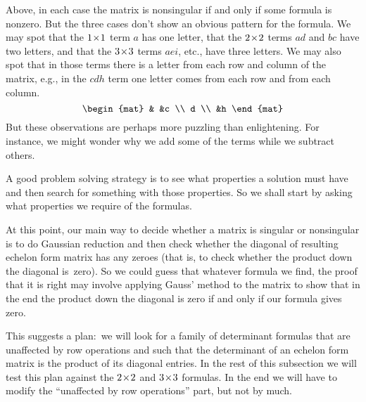 Above, in each case the matrix is nonsingular if and only 
if some formula is nonzero.
But the three cases don't 
show an obvious pattern for the formula. 
We may spot that the \(1 \! \times \! 1\) term
\( a \) has one letter, that the \(2 \! \times \! 2\) terms
\(ad\) and \(bc\) have two letters, and that the \(3 \! \times \! 3\)
terms \(aei\), etc., have three letters.
We may also spot that in those terms
there is a letter from each row and column of the matrix, e.g., 
in the \(cdh\) term one letter 
comes from each row and from each column.
\begin{equation*}
   \begin{mat}
          &    &c \\
      d           \\
          &h
   \end{mat} 
\end{equation*}
But these observations are perhaps more puzzling than
enlightening.
For instance, we might wonder why 
we add some of the terms while we subtract others.

A good problem solving strategy is to
see what properties a solution must have and
then search for something with those properties.
So we shall start by asking what properties we require of the formulas.

At this point, our
main way to decide whether a matrix is singular or nonsingular
is to do Gaussian 
reduction and then check whether 
the diagonal of resulting echelon form matrix has any zeroes
(that is, to check whether the product down the diagonal is~zero).
So we could guess that whatever formula we find, the proof that 
it is right may involve applying Gauss' method to the matrix
to show that in the end the product down the diagonal is zero if and only if
our formula gives zero. 

This suggests a plan:~we will look for a family of determinant
formulas that are 
unaffected by row operations and such that the determinant of an
echelon form matrix is the product of its diagonal entries.
In the rest of this subsection we will test this plan against the 
$2 \! \times \! 2$ and $3 \! \times \! 3$ formulas.
In the end we will have to modify the ``unaffected by row operations'' 
part, but not by much.

